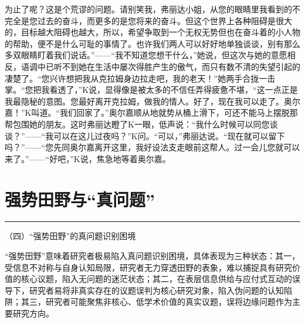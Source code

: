 \documentclass[12pt,a4paper]{article}
\begin{document}
为止了呢？这是个荒谬的问题。请别笑我，弗丽达小姐，从您的眼睛里我看到的不完全是您过去的奋斗，而更多的是您将来的奋斗。但这个世界上各种阻碍是很大的，目标越大阻碍也越大，所以，希望争取到一个无权无势但也在奋斗着的小人物的帮助，便不是什么可耻的事情了。也许我们两人可以好好地单独谈谈，别有那么多双眼睛盯着我们说话。”——“我不知道您想干什么，”她说，但这次与她的意愿相反，语调中已听不到她在生活中屡次得胜产生的傲气，而只有数不清的失望引起的凄楚了。“您兴许想把我从克拉姆身边拉走吧，我的老天！”她两手合拢一击掌。“您把我看透了，”K说，显得像是被太多的不信任弄得疲惫不堪，“这一点正是我最隐秘的意图。您最好离开克拉姆，做我的情人。好了，现在我可以走了。奥尔嘉！”K叫道。“我们回家了。”奥尔嘉顺从地就势从桶上滑下，可还不能马上摆脱那帮包围她的朋友。这时弗丽达瞪了K一眼，低声说：“我什么时候可以同您谈谈？”——“我可以在这儿过夜吗？”K问。“可以，”弗丽达说。“现在就可以留下吗？”——“您先同奥尔嘉离开这里，我好设法支走眼前这帮人。过一会儿您就可以来了。”——“好吧，”K说，焦急地等着奥尔嘉。
\par{}
\newpage
\section{强势田野与“真问题”}
\vspace{0.5em}
\vspace{0.3em}

\noindent\rule{\textwidth}{0.4pt}

\vspace{0.3em}



（四）“强势田野”的真问题识别困境



“强势田野”意味着研究者极易陷入真问题识别困境，具体表现为三种状态：其一，受信息不对称与自身认知局限，研究者无力穿透田野的表象，难以捕捉具有研究价值的核心议题，陷入无问题的迷茫状态；其二，在表层信息供给与应付式互动的误导下，研究者易将非真实存在的议题误判为核心研究对象，陷入伪问题的认知陷阱；其三，研究者可能聚焦非核心、低学术价值的真实议题，误将边缘问题作为主要研究方向。
\end{document}
